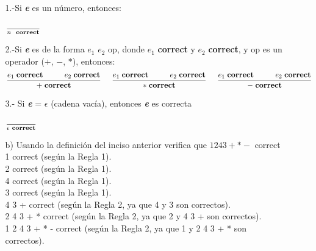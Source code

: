 \documentclass{article}
\begin{document}
\begin{enumerate}
\begin{itemize}
            1.-Si \textit{\textbf{e}} es un número, entonces:

            \begin{center}
                \Large{$\frac{}{n\hspace{0.2cm}\textbf{correct}}$}
            \end{center}

            2.-Si \textit{\textbf{e}} es de la forma \textit{\textbf{$e_1$}} \textit{\textbf{$e_2$}} op, donde \textit{\textbf{$e_1$}} \textbf{correct} y \textit{\textbf{$e_2$}} \textbf{correct}, y op es un operador ($+$, $-$, $*$), entonces:\\

            $$
            \frac{e_1\hspace{0.1cm}\textbf{correct}\hspace{1cm}e_2\hspace{0.1cm}\textbf{correct}}{+\hspace{0.1cm}\textbf{correct}}\hspace{0.5cm}\frac{e_1\hspace{0.1cm}\textbf{correct}\hspace{1cm}e_2\hspace{0.1cm}\textbf{correct}}{*\hspace{0.1cm}\textbf{correct}}\hspace{0.5cm}\frac{e_1\hspace{0.1cm}\textbf{correct}\hspace{1cm}e_2\hspace{0.1cm}\textbf{correct}}{-\hspace{0.1cm}\textbf{correct}}
            $$

            3.- Si \textit{\textbf{e}} = $\epsilon$ (cadena vacía), entonces \textit{\textbf{e}} es correcta\\

            \begin{center}
                \Large{$\frac{}{\epsilon\hspace{0.1cm} \textbf{correct}}$}
            \end{center}
            
            \item[b)] Usando la definición del inciso anterior verifica que $1 2 4 3 + * -$ correct\\

            1 correct (según la Regla 1).\\
            2 correct (según la Regla 1).\\
            4 correct (según la Regla 1).\\
            3 correct (según la Regla 1).\\
            4 3 + correct (según la Regla 2, ya que 4 y 3 son correctos).\\
            2 4 3 + * correct (según la Regla 2, ya que 2 y 4 3 + son correctos).\\
            1 2 4 3 + * - correct (según la Regla 2, ya que 1 y 2 4 3 + * son correctos).\\


\end{itemize}
\end{enumerate}
\end{document}

